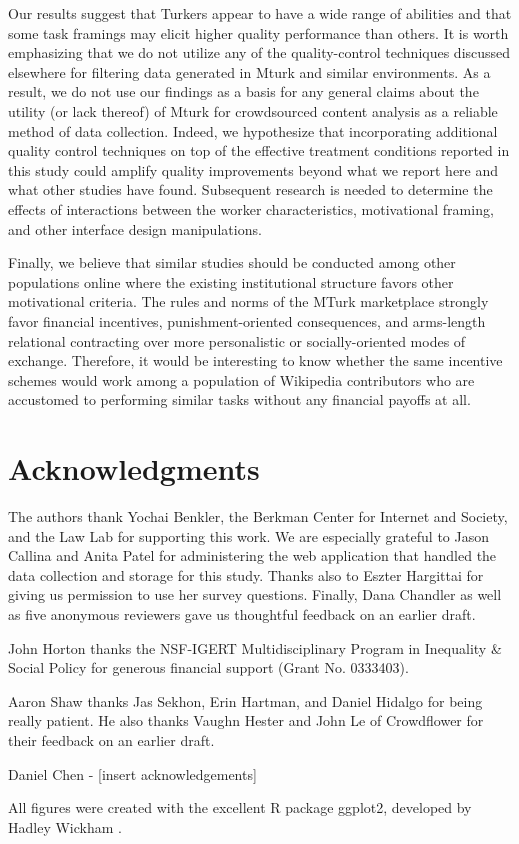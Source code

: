 \documentclass{chi2009}
\begin{document}
Our results suggest that Turkers appear to have a wide range of
abilities and that some task framings may elicit higher quality
performance than others. It is worth emphasizing that we do not
utilize any of the quality-control techniques discussed elsewhere for
filtering data generated in Mturk and similar
environments\cite{von2004labeling, ipeirotis2010, snow2008cheap,
  Hopkins-King2010, downs2010your, chandler2010, kapelnerpreventing}.
As a result, we do not use our findings as a basis for any general
claims about the utility (or lack thereof) of Mturk for crowdsourced
content analysis as a reliable method of data collection. Indeed, we
hypothesize that incorporating additional quality control techniques
on top of the effective treatment conditions reported in this study
could amplify quality improvements beyond what we report here and what
other studies have found. Subsequent research is needed to determine
the effects of interactions between the worker characteristics,
motivational framing, and other interface design manipulations.

Finally, we believe that similar studies should be conducted among
other populations online where the existing institutional structure
favors other motivational criteria. The rules and norms of the MTurk
marketplace strongly favor financial incentives, punishment-oriented
consequences, and arms-length relational contracting over more
personalistic or socially-oriented modes of exchange. Therefore, it
would be interesting to know whether the same incentive schemes would
work among a population of Wikipedia contributors who are accustomed
to performing similar tasks without any financial payoffs at all.

\section{Acknowledgments}

The authors thank Yochai Benkler, the Berkman Center for Internet and
Society, and the Law Lab for supporting this work. We are especially
grateful to Jason Callina and Anita Patel for administering the web
application that handled the data collection and storage for this
study. Thanks also to Eszter Hargittai for giving us permission to use
her survey questions. Finally, Dana Chandler as well as five anonymous
reviewers gave us thoughtful feedback on an earlier draft.

John Horton thanks the NSF-IGERT Multidisciplinary Program in
Inequality \& Social Policy for generous financial support (Grant
No. 0333403).

Aaron Shaw thanks Jas Sekhon, Erin Hartman, and Daniel Hidalgo for being really patient. He also thanks Vaughn Hester and John Le of Crowdflower for their feedback on an earlier draft.

Daniel Chen - [insert acknowledgements]

All figures were created with the excellent R package ggplot2, developed by 
Hadley Wickham \cite{wickham2008ggplot2}.
%


\end{document}
